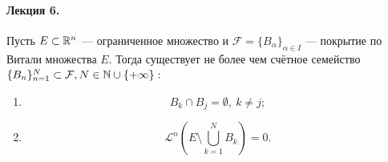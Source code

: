 \paragraph{Лекция 6.}
\begin{theorem}
    Пусть $E \subset \mathbb{R}^n$ — ограниченное множество и $\mathcal{F} = \{B_\alpha\}_{\alpha \in I}$ — покрытие по Витали множества $E$.
    Тогда существует не более чем счётное семейство $\{B_n\}_{n=1}^N \subset \mathcal{F}, N \in \mathbb{N} \cup \{+\infty\}:$
    \begin{enumerate}
        \item \[B_k \cap B_j = \emptyset, \ k \neq j;\]
        \item \[\mathcal{L}^n \left(E \setminus \bigcup\limits_{k=1}^{N}B_k\right) = 0.\]
    \end{enumerate}
\end{theorem} 
